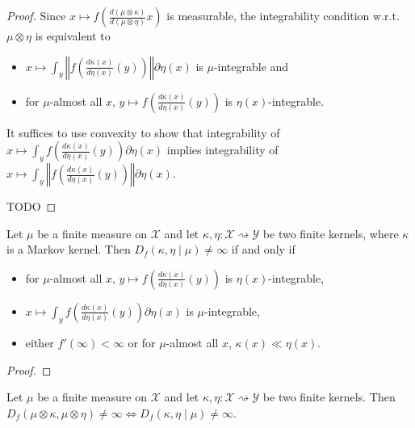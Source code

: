 \begin{proof}
Since $x \mapsto f \left(\frac{d(\mu \otimes \kappa)}{d(\mu \otimes \eta)} x \right)$ is measurable, the integrability condition w.r.t. $\mu \otimes \eta$ is equivalent to
\begin{itemize}
    \item $x \mapsto \int_y \left\Vert f \left( \frac{d\kappa(x)}{d\eta(x)}(y) \right) \right\Vert \partial \eta(x)$ is $\mu$-integrable and
    \item for $\mu$-almost all $x$, $y \mapsto f \left( \frac{d\kappa(x)}{d\eta(x)}(y) \right)$ is $\eta(x)$-integrable. 
  \end{itemize}
It suffices to use convexity to show that integrability of $x \mapsto \int_y f \left( \frac{d\kappa(x)}{d\eta(x)}(y) \right) \partial \eta(x)$ implies integrability of $x \mapsto \int_y \left\Vert f \left( \frac{d\kappa(x)}{d\eta(x)}(y) \right) \right\Vert \partial \eta(x)$.

TODO
\end{proof}


\begin{lemma}
  \label{lem:condFDiv_ne_top_iff}
  \leanok
  Let $\mu$ be a finite measure on $\mathcal X$ and let $\kappa, \eta : \mathcal X \rightsquigarrow \mathcal Y$ be two finite kernels, where $\kappa$ is a Markov kernel.
  Then $D_f(\kappa, \eta \mid \mu) \ne \infty$ if and only if
  \begin{itemize}
    \item for $\mu$-almost all $x$, $y \mapsto f \left( \frac{d\kappa(x)}{d\eta(x)}(y) \right)$ is $\eta(x)$-integrable,
    \item $x \mapsto \int_y f \left( \frac{d\kappa(x)}{d\eta(x)}(y) \right) \partial \eta(x)$ is $\mu$-integrable,
    \item either $f'(\infty) < \infty$ or for $\mu$-almost all $x$, $\kappa(x) \ll \eta(x)$.
  \end{itemize}
\end{lemma}

\begin{proof} \leanok
{}
\end{proof}


\begin{lemma}
  \label{lem:fDiv_compProd_ne_top_iff}
  \leanok
  Let $\mu$ be a finite measure on $\mathcal X$ and let $\kappa, \eta : \mathcal X \rightsquigarrow \mathcal Y$ be two finite kernels.
  Then $D_f(\mu \otimes \kappa, \mu \otimes \eta) \ne \infty \iff D_f(\kappa, \eta \mid \mu) \ne \infty$.
\end{lemma}

